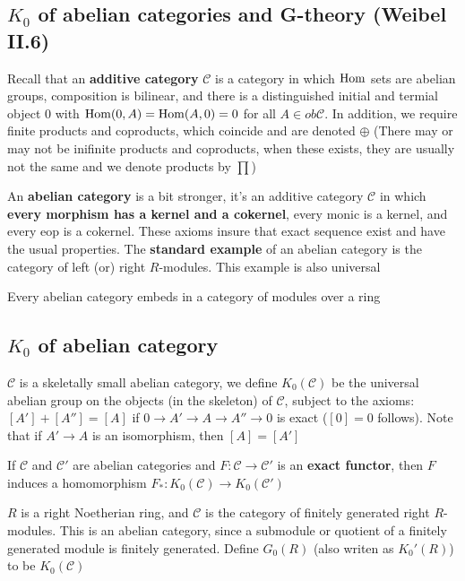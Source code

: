 \documentclass[main]{subfiles}
\begin{document}
\subsection{$K_0$ of abelian categories and G-theory (Weibel II.6)}

Recall that an \textbf{additive category} $\mathscr C$ is a category in which $\operatorname{Hom}$ sets are abelian groups, composition is bilinear, and there is a distinguished initial and termial object 0 with $\operatorname{Hom}(0,A)=\operatorname{Hom}(A,0)=0$ for all $A\in ob\mathscr C$. In addition, we require finite products and coproducts, which coincide and are denoted $\oplus$ (There may or may not be inifinite products and coproducts, when these exists, they are usually not the same and we denote products by $\prod$)

An \textbf{abelian category} is a bit stronger, it's an additive category $\mathscr C$ in which \textbf{every morphism has a kernel and a cokernel}, every monic is a kernel, and every eop is a cokernel. These axioms insure that exact sequence exist and have the usual properties. The \textbf{standard example} of an abelian category is the category of left (or) right $R$-modules. This example is also universal

\begin{theorem}
Every abelian category embeds in a category of modules over a ring
\end{theorem}

\subsection{$K_0$ of abelian category}

$\mathscr C$ is a skeletally small abelian category, we define $K_0(\mathscr C)$ be the universal abelian group on the objects (in the skeleton) of $\mathscr C$, subject to the axioms: $[A']+[A'']=[A]$ if $0\to A'\to A\to A''\to0$ is exact ($[0]=0$ follows). Note that if $A'\to A$ is an isomorphism, then $[A]=[A']$

If $\mathcal C$ and $\mathcal C'$ are abelian categories and $F:\mathcal C\to \mathcal C'$ is an \textbf{exact functor}, then $F$ induces a homomorphism $F_*:K_0(\mathcal C)\to K_0(\mathcal C')$

\begin{example}
$R$ is a right Noetherian ring, and $\mathcal C$ is the category of finitely generated right $R$-modules. This is an abelian category, since a submodule or quotient of a finitely generated module is finitely generated. Define $G_0(R)$ (also writen as $K_0'(R)$) to be $K_0(\mathcal C)$
\end{example}
\end{document}
